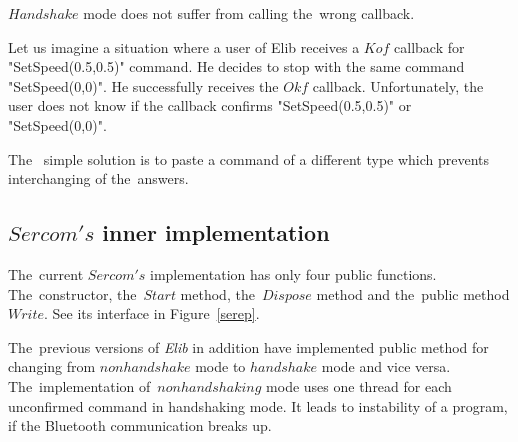   $Handshake$ mode does not suffer from calling the~wrong callback. 

  \begin{example}
  Let us imagine a situation where a user of Elib receives a $Kof$ callback for "SetSpeed(0.5,0.5)" command.
  He decides to stop with the same command "SetSpeed(0,0)". He successfully receives the $Okf$ callback.
  Unfortunately, the user does not know if the callback confirms "SetSpeed(0.5,0.5)" or "SetSpeed(0,0)".
  \end{example}
  The~ simple solution is to paste a command of a different type which prevents interchanging of the~answers.

\subsection{$Sercom's$ inner implementation}\label{sec:versions}
  The~current $Sercom's$ implementation has only four public functions.
  The~constructor, the~$Start$ method, the~$Dispose$ method and the~public method $Write$. 
  See its interface in Figure~\ref{serep}.	

  The~previous versions of {\it Elib} in addition have implemented public 
  method for changing from $nonhandshake$ mode to 
  $handshake$ mode and vice versa.
  The~implementation of~$nonhandshaking$ mode uses one 
  thread for each unconfirmed command in handshaking mode.
  It leads to instability of a program, if the Bluetooth communication breaks up.
  
